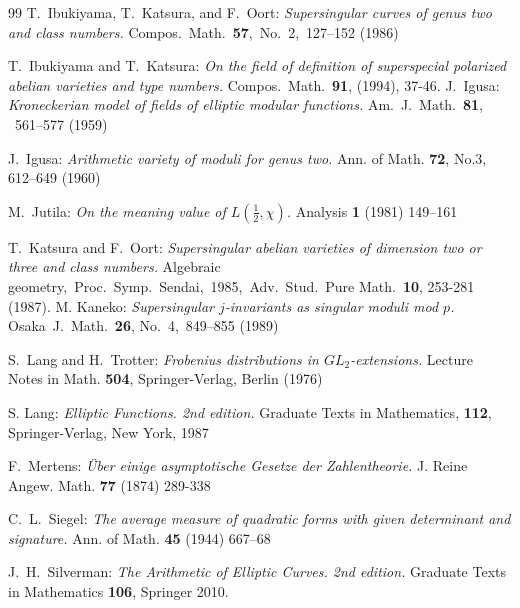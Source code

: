\documentclass[a4paper, 11pt]{article}
\theoremstyle{plain}
\newcommand{\?}{\textcolor{red}{??}}
\begin{document}
\begin{thebibliography}{99}
 T.\ Ibukiyama, T.\ Katsura, and F.\ Oort:
 \textit{Supersingular curves of genus two and class numbers.}
 Compos.\  Math.\ {\bf 57},\ No.\ 2,\ 127--152 (1986)

 T.\ Ibukiyama and T.\ Katsura:
 \textit{On the field of definition of superspecial
polarized abelian varieties and type numbers.}
Compos.\ Math.\  {\bf 91}, (1994), 37-46.
J.\ Igusa: \textit{Kroneckerian model of fields of elliptic modular functions.}
Am.\ J.\ Math.\ {\bf 81}, \ 561--577 (1959)


J.\ Igusa:
\textit{Arithmetic variety of moduli for genus two.}
Ann. of Math. {\bf 72}, No.3, 612--649 (1960)

M.\ Jutila:
\textit{On the meaning value of $L(\frac{1}{2}, \chi)$.}
Analysis {\bf 1} (1981) 149--161 

T.\ Katsura and F.\ Oort:
\textit{Supersingular abelian varieties of dimension two or three and class numbers.}
Algebraic geometry,\ Proc.\ Symp.\  Sendai,\ 1985,\ Adv.\ Stud.\ Pure Math.\ {\bf 10}, 253-281 (1987).
M. Kaneko:
\textit{Supersingular $j$-invariants as singular moduli mod $p$.}
Osaka\ J.\  Math.\ {\bf 26}, No.\ 4,\ 849--855 (1989) 


S.\ Lang and H.\ Trotter:
\textit{Frobenius distributions in ${GL}_2$-extensions.}
Lecture Notes in Math. {\bf 504}, Springer-Verlag, Berlin (1976)

S. Lang: \textit{Elliptic Functions.
2nd edition.} Graduate Texts in Mathematics, {\bf 112}, Springer-Verlag, New York, 1987



F.\ Mertens:
\textit{\"{U}ber einige asymptotische Gesetze der Zahlentheorie.} 
J. Reine Angew. Math. {\bf 77} (1874) 289-338

C.\ L.\ Siegel:
\textit{The average measure of quadratic forms with given determinant and signature.}
Ann. of Math. { \bf 45} (1944) 667--68

J.\ H.\ Silverman:
\textit{The Arithmetic of Elliptic Curves. 2nd edition.}
Graduate Texts in Mathematics {\bf 106}, Springer  2010.




\end{thebibliography}
\end{document}
